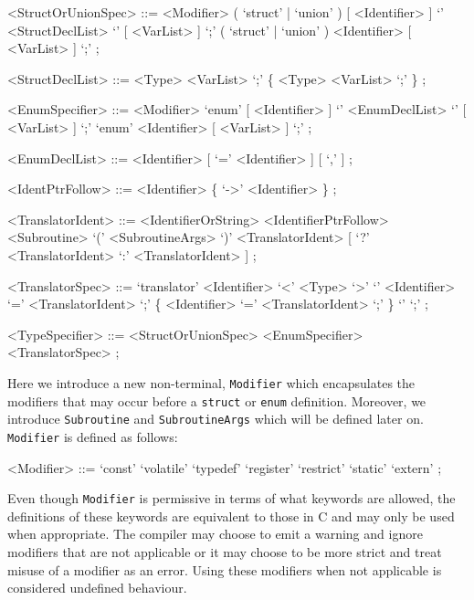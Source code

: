 \begin{grammar}
<StructOrUnionSpec> ::=  <Modifier> ( `struct' | `union' ) [ <Identifier> ] \newline
                         `{' <StructDeclList> `}' [ <VarList> ] `;'
                    \alt ( `struct' | `union' ) <Identifier> [ <VarList> ] `;' ;

<StructDeclList> ::= <Type> <VarList> `;' \{ <Type> <VarList> `;' \} ;

<EnumSpecifier> ::=  <Modifier> `enum' [ <Identifier> ] \newline
                     `{' <EnumDeclList> `}' [ <VarList> ] `;'
                \alt `enum' <Identifier> [ <VarList> ] `;' ;

<EnumDeclList> ::= <Identifier> [ `=' <Identifier> ] [ `,' ] ;

<IdentPtrFollow> ::= <Identifier> \{ `->' <Identifier> \} ;

<TranslatorIdent> ::=  <IdentifierOrString>
                  \alt <IdentifierPtrFollow>
                  \alt <Subroutine> `(' <SubroutineArgs> `)'
                  \alt <TranslatorIdent> [ `?' <TranslatorIdent> `:' <TranslatorIdent> ] ;

<TranslatorSpec> ::= `translator' <Identifier> `<' <Type> `>' `{' \newline
	<Identifier> `=' <TranslatorIdent> `;' \newline
        \{ <Identifier> `=' <TranslatorIdent> `;' \} `}' `;' ;

<TypeSpecifier> ::=  <StructOrUnionSpec>
                \alt <EnumSpecifier>
                \alt <TranslatorSpec> ;
\end{grammar}

\noindent
Here we introduce a new non-terminal, \texttt{Modifier} which encapsulates the
modifiers that may occur before a \texttt{struct} or \texttt{enum} definition.
Moreover, we introduce \texttt{Subroutine} and \texttt{SubroutineArgs} which
will be defined later on. \texttt{Modifier} is defined as follows:

\begin{grammar}
<Modifier> ::=  `const'
           \alt `volatile'
           \alt `typedef'
           \alt `register'
           \alt `restrict'
           \alt `static'
           \alt `extern' ;
\end{grammar}

\noindent
Even though \texttt{Modifier} is permissive in terms of what keywords are
allowed, the definitions of these keywords are equivalent to those in C and may
only be used when appropriate. The compiler may choose to emit a warning and
ignore modifiers that are not applicable or it may choose to be more strict and
treat misuse of a modifier as an error. Using these modifiers when not
applicable is considered undefined behaviour. \newline

